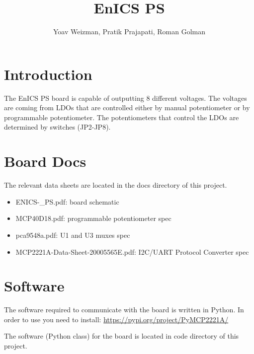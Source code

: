 \documentclass{article}
\title{EnICS PS}
\author{Yoav Weizman, Pratik Prajapati, Roman Golman}
\begin{document}
\maketitle

\begingroup
\let\clearpage\relax
\renewcommand{\contentsname}{Table of Contents}
\pagestyle{empty}
\tableofcontents		
\endgroup	
\clearpage

\section{Introduction} 
The EnICS PS board is capable of outputting 8 different voltages. The voltages are coming from LDOs that are controlled either by manual potentiometer or by programmable potentiometer. The potentiometers that control the LDOs are determined by switches (JP2-JP8).


\section{Board Docs} 
The relevant data sheets are located in the docs directory of this project.
\begin{itemize}
    \item ENICS-\_PS.pdf: board schematic 
    \item MCP40D18.pdf: programmable potentiometer spec
    \item pca9548a.pdf: U1 and U3 muxes spec
    \item MCP2221A-Data-Sheet-20005565E.pdf: I2C/UART Protocol Converter spec
\end{itemize}

\section{Software} 
The software required to communicate with the board is written in Python.
In order to use you need to install: \href{https://pypi.org/project/PyMCP2221A/}{https://pypi.org/project/PyMCP2221A/}

The software (Python class) for the board is located in code directory of this project.
\end{document}
